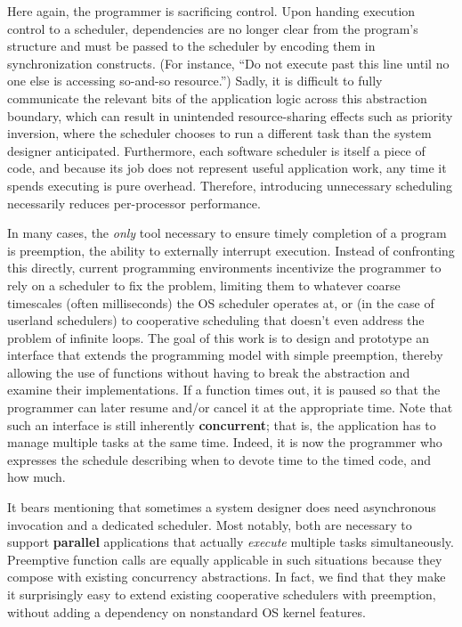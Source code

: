 Here again, the programmer is sacrificing control.  Upon handing execution control to
a scheduler, dependencies are no longer clear from the program's structure and must
be passed to the scheduler by encoding them in synchronization constructs.  (For
instance, ``Do not execute past this line until no one else is accessing so-and-so
resource.'')  Sadly,
it is difficult to fully communicate the relevant bits of the application logic
across this abstraction boundary, which can result in unintended resource-sharing
effects such as priority inversion, where the scheduler chooses to run a different
task than the system designer anticipated.  Furthermore, each software scheduler is
itself a
piece of code, and because its job does not represent useful application work, any
time it spends executing is pure overhead.  Therefore, introducing unnecessary
scheduling necessarily reduces per-processor performance.

In many cases, the \textit{only} tool necessary to ensure timely completion of a
program is preemption, the ability to externally interrupt execution.  Instead of
confronting this directly, current programming
environments incentivize the programmer to rely on a scheduler to fix the problem,
limiting them to whatever coarse timescales (often milliseconds) the OS scheduler
operates at, or (in the case of userland schedulers) to cooperative scheduling
that doesn't even address the problem of infinite loops.  The goal of this work is to
design and prototype an interface that extends the programming model with simple
preemption, thereby allowing the use of functions without having to break the
abstraction and examine their implementations.  If a function times out, it is
paused so that the programmer can later resume and/or cancel it at the appropriate
time.  Note that such an interface is still inherently \textbf{concurrent}; that is,
the application has to manage multiple tasks at the same time.  Indeed, it is now the
programmer who expresses the schedule describing when to devote time to the timed
code, and how much.

It bears mentioning that sometimes a system designer does need asynchronous
invocation and a dedicated scheduler.  Most notably, both are necessary to support
\textbf{parallel} applications that actually \textit{execute} multiple tasks
simultaneously.  Preemptive function calls are equally applicable in such situations
because they compose with existing concurrency abstractions.  In fact, we find that
they make it surprisingly easy to extend existing cooperative schedulers with
preemption, without adding a dependency on nonstandard OS kernel features.


